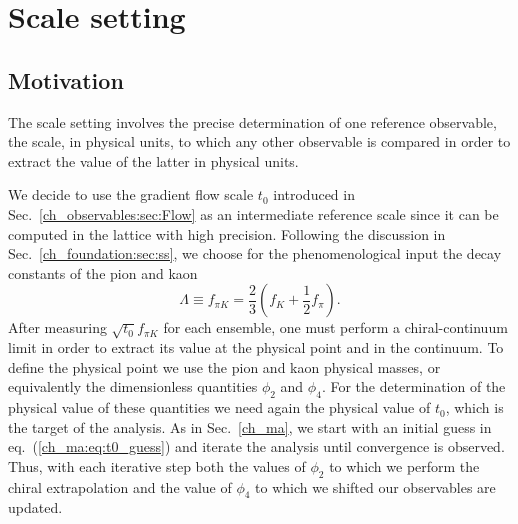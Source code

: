 \chapter{Scale setting}


\label{ch_ss}


\section{Motivation}
\label{ch_ss:sec:introduction}

The scale setting involves the precise determination of one reference observable, the scale, in physical units, to which any other observable is compared in order to extract the value of the latter in physical units. 

We decide to use the gradient flow scale $t_0$ introduced in Sec.~\ref{ch_observables:sec:Flow} as an intermediate reference scale since it can be computed in the lattice with high precision. Following the discussion in Sec.~\ref{ch_foundation:sec:ss}, we choose for the phenomenological input the decay constants of the pion and kaon
\begin{equation}
\label{ch_ss:eq:fpik}
\Lambda\equiv f_{\pi K}=\frac{2}{3}\left(f_K+\frac{1}{2}f_{\pi}\right).
\end{equation}
After measuring $\sqrt{t_0}f_{\pi K}$ for each ensemble, one must perform a chiral-continuum limit in order to extract its value at the physical point and in the continuum. To define the physical point we use the pion and kaon physical masses, or equivalently the dimensionless quantities $\phi_2$ and $\phi_4$. For the determination of the physical value of these quantities we need again the physical value of $t_0$, which is the target of the analysis. As in Sec.~\ref{ch_ma}, we start with an initial guess in eq.~(\ref{ch_ma:eq:t0_guess}) and iterate the analysis until convergence is observed. Thus, with each iterative step both the values of $\phi_2$ to which we perform the chiral extrapolation and the value of $\phi_4$ to which we shifted our observables are updated. 

